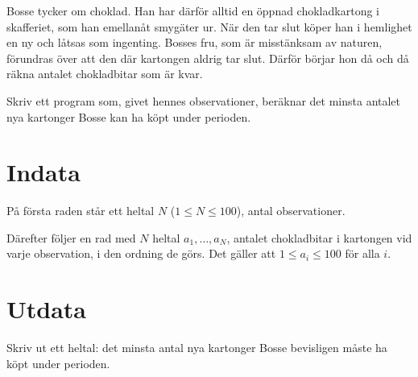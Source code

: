 Bosse tycker om choklad.
Han har därför alltid en öppnad chokladkartong i skafferiet, som han emellanåt smygäter ur.
När den tar slut köper han i hemlighet en ny och låtsas som ingenting.
Bosses fru, som är misstänksam av naturen, förundras över att den där kartongen aldrig tar slut.
Därför börjar hon då och då räkna antalet chokladbitar som är kvar.

Skriv ett program som, givet hennes observationer, beräknar det minsta antalet nya kartonger Bosse kan ha köpt under perioden.

\section*{Indata}
På första raden står ett heltal $N$ ($1 \le N \le 100$), antal observationer.

Därefter följer en rad med $N$ heltal $a_1, \ldots, a_N$, antalet chokladbitar i kartongen vid varje observation, i den ordning de görs.
Det gäller att $1 \le a_i \le 100$ för alla $i$.

\section*{Utdata}
Skriv ut ett heltal: det minsta antal nya kartonger Bosse bevisligen måste ha köpt under perioden.
